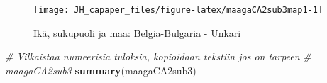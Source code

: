 \documentclass[
  finnish,
]{book}
\newenvironment{Shaded}{\begin{snugshade}}{\end{snugshade}}
\newcommand{\CommentTok}[1]{\textcolor[rgb]{0.56,0.35,0.01}{\textit{#1}}}
\newcommand{\KeywordTok}[1]{\textcolor[rgb]{0.13,0.29,0.53}{\textbf{#1}}}
\newcommand{\NormalTok}[1]{#1}
\begin{document}
\begin{figure}

{\centering \texttt{[image: JH\_capaper\_files/figure-latex/maagaCA2sub3map1-1]} 

}

\caption{Ikä, sukupuoli ja maa: Belgia-Bulgaria - Unkari}\label{fig:maagaCA2sub3map1}
\end{figure}

\begin{Shaded}
\begin{Highlighting}[]
\CommentTok{# Vilkaistaa numeerisia tuloksia, kopioidaan tekstiin jos on tarpeen}
\CommentTok{# maagaCA2sub3}
 \KeywordTok{summary}\NormalTok{(maagaCA2sub3)}
\end{Highlighting}
\end{Shaded}
\end{document}
